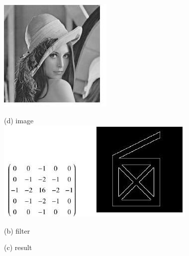 \documentclass[10pt]{article}
\begin{document}
\includegraphics[max width=\textwidth]{2022_01_06_b5ce182ed1bd5f482e5bg-14(1)}

(d) image\\

\includegraphics[max width=\textwidth]{2022_01_06_b5ce182ed1bd5f482e5bg-14(2)}

(b) filter

(c) result
\end{document}
